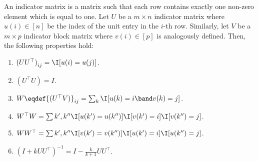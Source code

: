 \begin{lemma}%
\label{lem:indicator-matrix}

  An indicator matrix is a matrix such that each row contains exactly one non-zero element which is equal to one.
  Let $U$ be a $m\times n$ indicator matrix where $u(i) \in [n]$ be the index of the unit entry in the $i$-th row.
  Similarly, let $V$ be a $m\times p$ indicator block matrix where $v(i) \in [p]$ is analogously defined.
  Then, the following properties hold:
  \begin{enumerate}
    \item ${(UU^\top)}_{ij} = \I[u(i) = u(j)]$.
    \item ${(U^\top U)} = I$.
    \item $W \eqdef {(U^\top V)}_{ij} = \sum_{k} \I[u(k) = i \band v(k) = j]$.
    \item $W^\top W = \sum{k', k''} \I[u(k') = u(k'')] \I[v(k') = i] \I[v(k'') = j]$.
    \item $W W^\top = \sum{k', k''} \I[v(k') = v(k'')] \I[u(k') = i] \I[u(k'') = j]$.
    \item ${(I + k UU^\top)}^{-1} = I - \frac{k}{k+1} U U^\top$.
  \end{enumerate}
\end{lemma}
